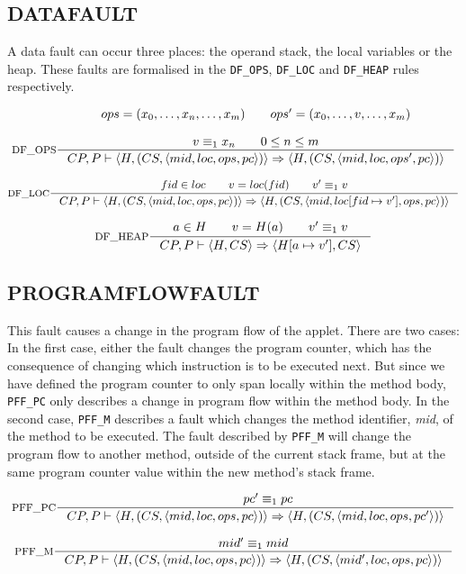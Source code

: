 \subsection{DATAFAULT}
A data fault can occur three places: the operand stack, the local variables or the heap. These faults are formalised in the \texttt{DF\_OPS}, \texttt{DF\_LOC} and \texttt{DF\_HEAP} rules respectively.

$$\inference[DF\_OPS]{  
ops = (x_0,  \ldots, x_n, \ldots, x_m) \semsp
ops' = (x_0, \ldots, v, \ldots, x_m) \semnl \\
v \equiv_1 x_n \semsp
0 \leq n \leq m 
}
{CP, P \vdash \langle H, (CS, \langle  mid, loc, ops, pc \rangle)\rangle \Rightarrow \langle H, (CS, \langle mid, loc, ops', pc \rangle)\rangle}$$

$$\inference[DF\_LOC]{  
fid \in loc \semsp
 v = loc(fid) \semsp
  v' \equiv_1 v
}
{CP, P \vdash \langle H, (CS, \langle  mid, loc, ops, pc \rangle)\rangle  \Rightarrow \langle H, (CS, \langle mid, loc[fid \mapsto v'], ops, pc \rangle)\rangle }$$


$$\inference[DF\_HEAP]{  
a \in H \semsp
 v = H(a) \semsp
 v' \equiv_1 v
}
{CP, P \vdash \langle H, CS\rangle  \Rightarrow \langle H[a \mapsto v'], CS\rangle }$$


\subsection{PROGRAMFLOWFAULT} \label{sec:pff}
This fault causes a change in the program flow of the applet. There are two cases: In the first case, either the fault changes the program counter, which has the consequence of changing which instruction is to be executed next. But since we have defined the program counter to only span locally within the method body, \texttt{PFF\_PC} only describes a change in program flow within the method body. In the second case, \texttt{PFF\_M} describes a fault which changes the method identifier, \textit{mid}, of the method to be executed. The fault described by \texttt{PFF\_M} will change the program flow to another method, outside of the current stack frame, but at the same program counter value within the new method's stack frame.

$$\inference[PFF\_PC]{  
 \semsp pc' \equiv_1 pc
}
{CP, P \vdash \langle H, (CS, \langle  mid, loc, ops, pc \rangle)\rangle  \Rightarrow \langle H, (CS, \langle mid, loc, ops, pc' \rangle)\rangle}$$

$$\inference[PFF\_M]{  
mid' \equiv_1 mid
}
{CP, P \vdash \langle H, (CS, \langle  mid, loc, ops, pc \rangle)\rangle  \Rightarrow \langle H, (CS, \langle mid', loc, ops, pc \rangle)\rangle }$$

